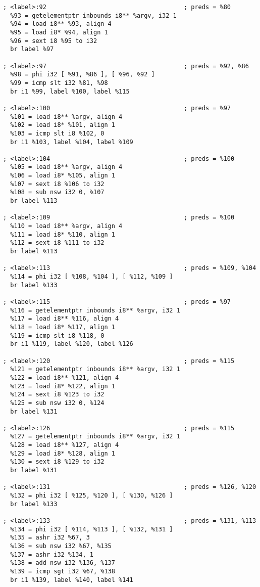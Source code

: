 \begin{lstlisting}[caption={Intermediate Representation from LLVM.}, label={lst:llvmir}]
; <label>:92                                      ; preds = %80
  %93 = getelementptr inbounds i8** %argv, i32 1
  %94 = load i8** %93, align 4
  %95 = load i8* %94, align 1
  %96 = sext i8 %95 to i32
  br label %97

; <label>:97                                      ; preds = %92, %86
  %98 = phi i32 [ %91, %86 ], [ %96, %92 ]
  %99 = icmp slt i32 %81, %98
  br i1 %99, label %100, label %115

; <label>:100                                     ; preds = %97
  %101 = load i8** %argv, align 4
  %102 = load i8* %101, align 1
  %103 = icmp slt i8 %102, 0
  br i1 %103, label %104, label %109

; <label>:104                                     ; preds = %100
  %105 = load i8** %argv, align 4
  %106 = load i8* %105, align 1
  %107 = sext i8 %106 to i32
  %108 = sub nsw i32 0, %107
  br label %113

; <label>:109                                     ; preds = %100
  %110 = load i8** %argv, align 4
  %111 = load i8* %110, align 1
  %112 = sext i8 %111 to i32
  br label %113

; <label>:113                                     ; preds = %109, %104
  %114 = phi i32 [ %108, %104 ], [ %112, %109 ]
  br label %133

; <label>:115                                     ; preds = %97
  %116 = getelementptr inbounds i8** %argv, i32 1
  %117 = load i8** %116, align 4
  %118 = load i8* %117, align 1
  %119 = icmp slt i8 %118, 0
  br i1 %119, label %120, label %126

; <label>:120                                     ; preds = %115
  %121 = getelementptr inbounds i8** %argv, i32 1
  %122 = load i8** %121, align 4
  %123 = load i8* %122, align 1
  %124 = sext i8 %123 to i32
  %125 = sub nsw i32 0, %124
  br label %131

; <label>:126                                     ; preds = %115
  %127 = getelementptr inbounds i8** %argv, i32 1
  %128 = load i8** %127, align 4
  %129 = load i8* %128, align 1
  %130 = sext i8 %129 to i32
  br label %131

; <label>:131                                     ; preds = %126, %120
  %132 = phi i32 [ %125, %120 ], [ %130, %126 ]
  br label %133

; <label>:133                                     ; preds = %131, %113
  %134 = phi i32 [ %114, %113 ], [ %132, %131 ]
  %135 = ashr i32 %67, 3
  %136 = sub nsw i32 %67, %135
  %137 = ashr i32 %134, 1
  %138 = add nsw i32 %136, %137
  %139 = icmp sgt i32 %67, %138
  br i1 %139, label %140, label %141


\end{lstlisting}
